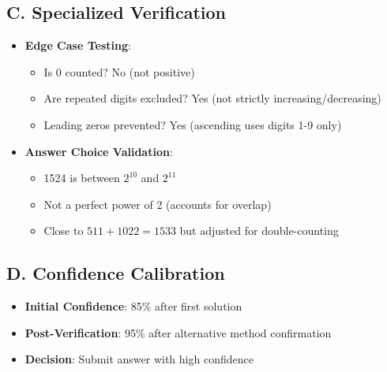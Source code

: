 \documentclass[]{article}
\begin{document}
\begin{verificationbox}
\subsection*{C. Specialized Verification}
\begin{itemize}[leftmargin=*]
    \item \textbf{Edge Case Testing}:
    \begin{itemize}
        \item Is 0 counted? No (not positive) \checkmark
        \item Are repeated digits excluded? Yes (not strictly increasing/decreasing) \checkmark
        \item Leading zeros prevented? Yes (ascending uses digits 1-9 only) \checkmark
    \end{itemize}
    
    \item \textbf{Answer Choice Validation}:
    \begin{itemize}
        \item 1524 is between $2^{10}$ and $2^{11}$ \checkmark
        \item Not a perfect power of 2 (accounts for overlap) \checkmark
        \item Close to $511 + 1022 = 1533$ but adjusted for double-counting \checkmark
    \end{itemize}
\end{itemize}

\subsection*{D. Confidence Calibration}
\begin{itemize}[leftmargin=*]
    \item \textbf{Initial Confidence}: 85\% after first solution
    \item \textbf{Post-Verification}: 95\% after alternative method confirmation
    \item \textbf{Decision}: Submit answer with high confidence
\end{itemize}
\end{verificationbox}
\end{document}
